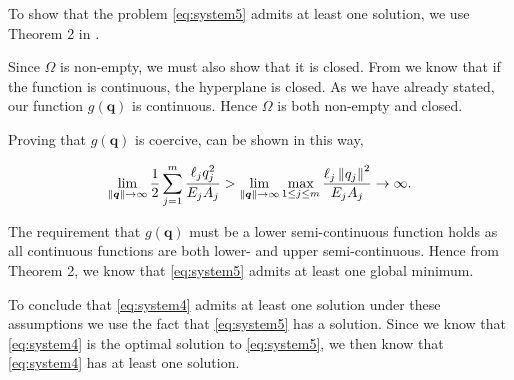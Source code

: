 To show that the problem \eqref{eq:system5} admits at least one solution, we use Theorem 2 in \cite{optThe}.

Since $\Omega$ is non-empty, we must also show that it is closed. From \cite{hyper} we know that if the function is continuous, the hyperplane is closed. As we have already stated, our function $g(\bm{q})$ is continuous. Hence $\Omega$ is both non-empty and closed.

Proving that $g(\bm{q})$ is coercive, can be shown in this way,

\begin{equation}
\lim_{\left\|\bm{q}\right\|\to\infty} \frac{1}{2}\sum_{j=1}^{m}\frac{\ell_{j}q_{j}^{2}}{E_{j}A_{j}} > 
\lim_{\left\|\bm{q}\right\|\to\infty} \max_{1 \leq j \leq m} \frac{\ell_{j}\left\|{q_{j}}\right\|^{2}}{E_{j}A_{j}} \rightarrow \infty.
\end{equation}

The requirement that $g(\bm{q})$ must be a lower semi-continuous function holds as all continuous functions are both lower- and upper semi-continuous. Hence from Theorem 2, we know that \eqref{eq:system5} admits at least one global minimum.

To conclude that \eqref{eq:system4} admits at least one solution under these assumptions we use the fact that \eqref{eq:system5} has a solution. Since we know that \eqref{eq:system4} is the optimal solution to \eqref{eq:system5}, we then know that \eqref{eq:system4} has at least one solution.